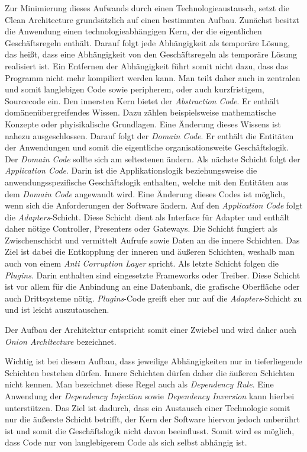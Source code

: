 Zur Minimierung dieses Aufwands durch einen Technologieaustausch, setzt die Clean Architecture grundsätzlich auf einen bestimmten Aufbau.
Zunächst besitzt die Anwendung einen technologieabhängigen Kern, der die eigentlichen Geschäftsregeln enthält.
Darauf folgt jede Abhängigkeit als temporäre Lösung, das heißt, dass eine Abhängigkeit von den Geschäftsregeln als temporäre Lösung realisiert ist.
Ein Entfernen der Abhängigkeit führt somit nicht dazu, dass das Programm nicht mehr kompiliert werden kann.
Man teilt daher auch in zentralen und somit langlebigen Code sowie peripherem, oder auch kurzfristigem, Sourcecode ein.
Den innersten Kern bietet der \textit{Abstraction Code}. 
Er enthält domänenübergreifendes Wissen. 
Dazu zählen beispielsweise mathematische Konzepte oder phyisikalische Grundlagen.
Eine Änderung dieses Wissens ist nahezu ausgeschlossen.
Darauf folgt der \textit{Domain Code}.
Er enthält die Entitäten der Anwendungen und somit die eigentliche organisationsweite Geschäftslogik.
Der \textit{Domain Code} sollte sich am seltestenen ändern.
Als nächste Schicht folgt der \textit{Application Code}.
Darin ist die Applikationslogik beziehungsweise die anwendungsspezifische Geschäftslogik enthalten, welche mit den Entitäten aus dem \textit{Domain Code} angewandt wird.
Eine Änderung dieses Codes ist möglich, wenn sich die Anforderungen der Software ändern.
Auf den \textit{Application Code} folgt die \textit{Adapters}-Schicht.
Diese Schicht dient als Interface für Adapter und enthält daher nötige Controller, Presenters oder Gateways.
Die Schicht fungiert als Zwischenschicht und vermittelt Aufrufe sowie Daten an die innere Schichten.
Das Ziel ist dabei die Entkopplung der inneren und äußeren Schichten, weshalb man auch von einem \textit{Anti Corruption Layer} spricht.
Als letzte Schicht folgen die \textit{Plugins}.
Darin enthalten sind eingesetzte Frameworks oder Treiber.
Diese Schicht ist vor allem für die Anbindung an eine Datenbank, die grafische Oberfläche oder auch Drittsysteme nötig.
\textit{Plugins}-Code greift eher nur auf die \textit{Adapters}-Schicht zu und ist leicht auszutauschen.

Der Aufbau der Architektur entspricht somit einer Zwiebel und wird daher auch \textit{Onion Architecture} bezeichnet.

Wichtig ist bei diesem Aufbau, dass jeweilige Abhängigkeiten nur in tieferliegende Schichten bestehen dürfen.
Innere Schichten dürfen daher die äußeren Schichten nicht kennen.
Man bezeichnet diese Regel auch als \textit{Dependency Rule}.
Eine Anwendung der \textit{Dependency Injection} sowie \textit{Dependency Inversion} kann hierbei unterstützen.
Das Ziel ist dadurch, dass ein Austausch einer Technologie somit nur die äußerste Schicht betrifft, der Kern der Software hiervon jedoch unberührt ist und somit die Geschäftslogik nicht davon beeinflusst.
Somit wird es möglich, dass Code nur von langlebigerem Code als sich selbst abhängig ist.

